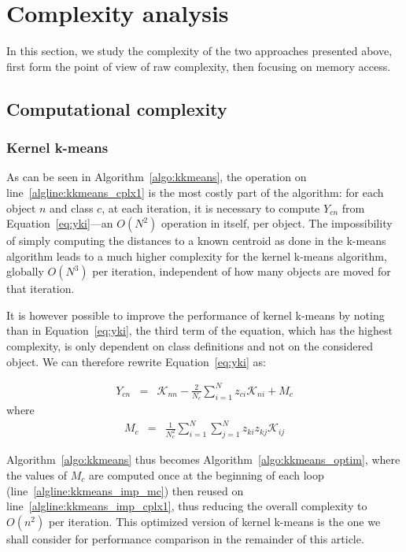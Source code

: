 \documentclass[natbib,smallextended]{svjour3}
\newcommand{\cad}{---} %
\begin{document}
\section{Complexity analysis}
\label{sec:complexity}

In this section, we study the complexity of the two approaches presented above, first form the point of view of raw complexity, then focusing on memory access.

\subsection{Computational complexity}

\subsubsection{Kernel k-means}

As can be seen in Algorithm~\ref{algo:kkmeans}, the operation on line~\ref{algline:kkmeans_cplx1} is the most costly part of the algorithm: for each object $n$ and class $c$, at each iteration, it is necessary to compute $Y_{cn}$ from Equation~\ref{eq:yki}\cad{}an $O(N^2)$ operation in itself, per object. The impossibility of simply computing the distances to a known centroid as done in the k-means algorithm leads to a much higher complexity for the kernel k-means algorithm, globally $O(N^3)$ per iteration, independent of how many objects are moved for that iteration.

It is however possible to improve the performance of kernel k-means by noting than in Equation~\ref{eq:yki}, the third term of the equation, which has the highest complexity, is only dependent on class definitions and not on the considered object. We can therefore rewrite Equation~\ref{eq:yki} as:

\begin{eqnarray}
Y_{cn} & = & \mathcal{K}_{nn} - \frac{2}{N_c} \sum_{i=1}^{N} z_{ci} \mathcal{K}_{ni} + M_c \label{eq:yki_improved}
\end{eqnarray}
where
\begin{eqnarray}
M_c    & = & \frac{1}{N_c^2} \sum_{i=1}^{N} \sum_{j=1}^{N} z_{ki} z_{kj} \mathcal{K}_{ij} \label{eq:mc}
\end{eqnarray}

Algorithm~\ref{algo:kkmeans} thus becomes Algorithm~\ref{algo:kkmeans_optim}, where the values of $M_c$ are computed once at the beginning of each loop (line~\ref{algline:kkmeans_imp_mc}) then reused on line~\ref{algline:kkmeans_imp_cplx1}, thus reducing the overall complexity to $O(n^2)$ per iteration. This optimized version of kernel k-means is the one we shall consider for performance comparison in the remainder of this article.
\end{document}
